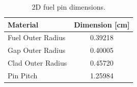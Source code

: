 \begin{table}[H]
  \centering
  \caption[2D fuel pin dimensions]{2D fuel pin dimensions.}
  \label{table:chap5-pin-dimensions} 
  \vspace{6pt}
  \begin{tabular}{b c}
  \toprule
  \rowcolor{lightgray}
  {\bf Material} &
  {\bf Dimension [cm]} \\
  \midrule
  Fuel Outer Radius &     0.39218 \\
  Gap Outer Radius &      0.40005 \\
  Clad Outer Radius &     0.45720 \\
  Pin Pitch &             1.25984 \\
  \bottomrule
\end{tabular}
\end{table}

